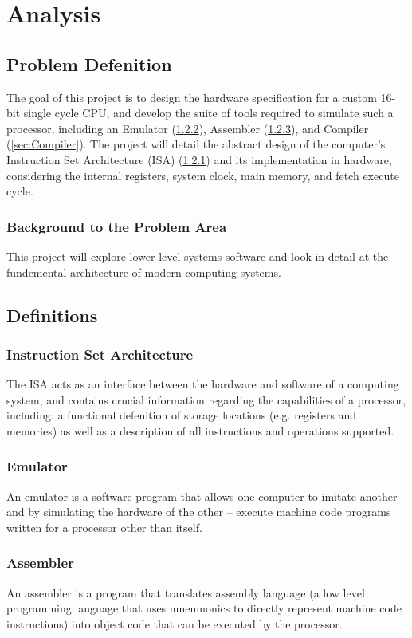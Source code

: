 \section{Analysis}
\subsection{Problem Defenition}
The goal of this project is to design the hardware specification for a custom 16-bit single cycle CPU, and develop the suite of tools required to simulate such a processor, including an Emulator (\ref{sec:Emulator}), Assembler (\ref{sec:Assembler}), and Compiler (\ref{sec:Compiler}). The project will detail the abstract design of the computer’s Instruction Set Architecture (ISA) (\ref{sec:ISA}) and its implementation in hardware, considering the internal registers, system clock, main memory, and fetch execute cycle.

\subsubsection{Background to the Problem Area}
This project will explore lower level systems software and look in detail at the fundemental architecture of modern computing systems. 

\subsection{Definitions}

\subsubsection{Instruction Set Architecture}
\label{sec:ISA}
The ISA acts as an interface between the hardware and software of a computing system, and contains crucial information regarding the capabilities of a processor, including: a functional defenition of storage locations (e.g. registers and memories) as well as a description of all instructions and operations supported.

\subsubsection{Emulator}
\label{sec:Emulator}
An emulator is a software program that allows one computer to imitate another - and by simulating the hardware of the other – execute machine code programs written for a processor other than itself.

\subsubsection{Assembler}
\label{sec:Assembler}
An assembler is a program that translates assembly language (a low level programming language that uses mneumonics to directly represent machine code instructions) into object code that can be executed by the processor. 


